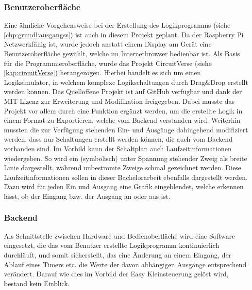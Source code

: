 \subsubsection{Benutzeroberfläche} \label{kap:grundl:bedienoberfl}
Eine ähnliche Vorgehensweise bei der Erstellung des Logikprogramms (siehe \autoref{chp:grundl:ausgangss}) ist auch in diesem Projekt geplant. Da der Raspberry Pi Netzwerkfähig ist, wurde jedoch anstatt einem Display am Gerät eine Benutzeroberfläche gewählt, welche im Internetbrowser bedienbar ist. Als Basis für die Programmieroberfläche, wurde das Projekt CircuitVerse \cite{URL:CircuitVerse} (siehe \autoref{kap:circuitVerse}) herangezogen. Hierbei handelt es sich um einen Logiksimulator, in welchem komplexe Logikschaltungen durch Drag\&Drop erstellt werden können. Das Quelloffene Projekt ist auf GitHub \cite{URL:CircuitVerseGit} verfügbar und dank der MIT Lizenz zur Erweiterung und Modifikation freigegeben. Dabei musste das Projekt vor allem durch eine Funktion ergänzt werden, um die erstellte Logik in einem Format zu Exportieren, welche vom Backend verstanden wird. Weiterhin mussten die zur Verfügung stehenden Ein- und Ausgänge dahingehend modifiziert werden, dass nur Schaltungen erstellt werden können, die auch vom Backend vorhanden sind. 
Im Vorbild kann der Schaltplan auch Laufzeitinformationen wiedergeben. So wird ein (symbolisch) unter Spannung stehender Zweig als breite Linie dargestellt, während unbestromte Zweige schmal gezeichnet werden. Diese Laufzeitinformationen sollen in dieser Bachelorarbeit ebenfalls dargestellt werden. Dazu wird für jeden Ein und Ausgang eine Grafik eingeblendet, welche erkennen lässt, ob der Eingang bzw. der Ausgang an oder aus ist.
\subsubsection{Backend} \label{chp:grundl:backend}
Als Schnittstelle zwischen Hardware und Bedienoberfläche wird eine Software eingesetzt, die das vom Benutzer erstellte Logikprogramm kontinuierlich durchläuft, und somit sicherstellt, das eine Änderung an einem Eingang, der Ablauf eines Timers etc. die Werte der davon abhängigen Ausgänge entsprechend verändert. Darauf wie dies im Vorbild der Easy Kleinsteuerung gelöst wird, bestand kein Einblick.  

